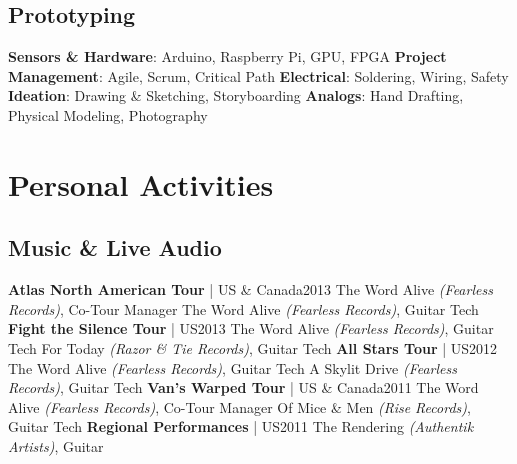 \documentclass{article}
\begin{document}
    \subsection*{Prototyping}
        \textbf{Sensors \& Hardware}: Arduino, Raspberry Pi, GPU, FPGA\newline
        \textbf{Project Management}: Agile, Scrum, Critical Path\newline
        \textbf{Electrical}: Soldering, Wiring, Safety\newline
        \textbf{Ideation}: Drawing \& Sketching, Storyboarding\newline
        \textbf{Analogs}: Hand Drafting, Physical Modeling, Photography
    \section*{Personal Activities}
    \subsection*{Music \& Live Audio}
        \textbf{Atlas North American Tour} | US \& Canada\hfill{2013}\newline
        The Word Alive \textit{(Fearless Records)}, Co-Tour Manager\newline
        The Word Alive \textit{(Fearless Records)}, Guitar Tech\newline\newline
        \textbf{Fight the Silence Tour} | US\hfill{2013}\newline
        The Word Alive \textit{(Fearless Records)}, Guitar Tech\newline
        For Today \textit{(Razor \& Tie Records)}, Guitar Tech\newline\newline
        \textbf{All Stars Tour} | US\hfill{2012}\newline
        The Word Alive \textit{(Fearless Records)}, Guitar Tech\newline
        A Skylit Drive \textit{(Fearless Records)}, Guitar Tech\newline\newline
        \textbf{Van's Warped Tour} | US \& Canada\hfill{2011}\newline
        The Word Alive \textit{(Fearless Records)}, Co-Tour Manager\newline
        Of Mice \& Men \textit{(Rise Records)}, Guitar Tech\newline\newline
        \textbf{Regional Performances} | US\hfill{2011}\newline
        The Rendering \textit{(Authentik Artists)}, Guitar
\end{document}
